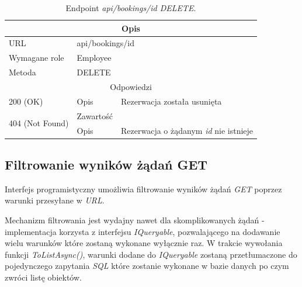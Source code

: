 \documentclass[eng,printmode,openany]{mgr}
\begin{document}
	\begin{table}[H]
		\caption{Endpoint \textit{api/bookings/id DELETE}.}
		\begin{tabularx}{\textwidth}{|l|l|X|}
			\hline
			\multicolumn{3}{|c|}{Opis}
			\\ \hline
			URL                       & \multicolumn{2}{l|}{api/bookings/id}
			\\ \hline
			Wymagane role             & \multicolumn{2}{l|}{Employee}
			\\ \hline
			Metoda                    & \multicolumn{2}{l|}{DELETE}
			\\ \hline
			\multicolumn{3}{|c|}{Odpowiedzi}
			\\ \hline
			200 (OK)			                & Opis         	& Rezerwacja została usunięta
			\\ \hline
			\multirow{2}{*}{404 (Not Found)} 	& Zawartość     & 
			\\ \cline{2-3}                      & Opis          & Rezerwacja o żądanym \textit{id} nie istnieje
			\\ \hline
		\end{tabularx}
	\end{table}
	
	
	\subsection{Filtrowanie wyników żądań GET}
	Interfejs programistyczny umożliwia filtrowanie wyników żądań \textit{GET} poprzez warunki przesyłane w \textit{URL}.
	
	Mechanizm filtrowania jest wydajny nawet dla skomplikowanych żądań - implementacja korzysta z interfejsu \textit{IQueryable}, pozwalającego na dodawanie wielu warunków które zostaną wykonane wyłącznie raz. W trakcie wywołania funkcji \textit{ToListAsync()}, warunki dodane do \textit{IQueryable} zostaną przetłumaczone do pojedynczego zapytania \textit{SQL} które zostanie wykonane w bazie danych po czym zwróci listę obiektów.
	
	
	
\end{document}
